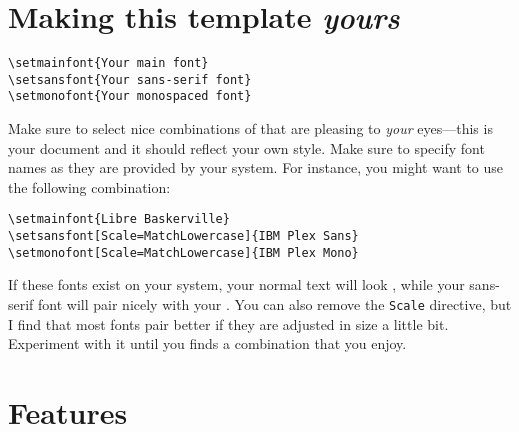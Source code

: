 \section{Making this template \emph{yours}}

%
\begin{verbatim}
\setmainfont{Your main font}
\setsansfont{Your sans-serif font}
\setmonofont{Your monospaced font}
\end{verbatim}
%
Make sure to select nice combinations of that are pleasing to
\emph{your} eyes---this is your document and it should reflect your own
style. Make sure to specify font names as they are provided by your
system. For instance, you might want to use the following combination:
%
\begin{verbatim}
\setmainfont{Libre Baskerville}
\setsansfont[Scale=MatchLowercase]{IBM Plex Sans}
\setmonofont[Scale=MatchLowercase]{IBM Plex Mono}
\end{verbatim}
%
\ifxetexorluatex
	If these fonts exist on your system, your normal text will look
		{}, while your sans-serif font {will
			pair nicely with your} {}.
	You can also remove the \verb|Scale| directive, but I find that most
	fonts pair better if they are adjusted in size a little bit. Experiment
	with it until you finds a combination that you enjoy.
\fi

\section{Features}

